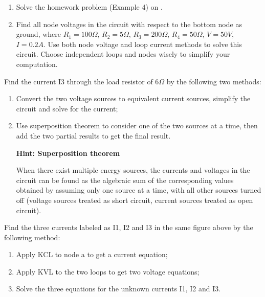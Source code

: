 \begin{enumerate}
\item Solve the homework problem (Example 4) on 
  .

\item Find all node voltages in the circuit with respect to the bottom node as
  ground, where $R_1=100\Omega$, $R_2=5\Omega$, $R_3=200\Omega$, $R_4=50\Omega$, 
  $V=50V$, $I=0.2A$.  Use both node voltage and loop current methods to solve 
  this circuit. Choose independent loops and nodes wisely to simplify your
  computation.  


\end{enumerate}


\item Find the current I3 through the load resistor of 6$\Omega$ by the
following two methods:
\begin{enumerate}
\item Convert the two voltage sources to equivalent current sources, 
	simplify the circuit and solve for the current;
\item Use superposition theorem to consider one of the two sources at a
  time, then add the two partial results to get the final result.

{\bf Hint: Superposition theorem}

When there exist multiple energy sources, the currents and voltages in 
the circuit can be found as the algebraic sum of the corresponding values 
obtained by assuming only one source at a time, with all other sources 
turned off (voltage sources treated as short circuit, current sources 
treated as open circuit).

\end{enumerate}



\item Find the three currents labeled as I1, I2 and I3 in the same figure 
	above by the following method:
\begin{enumerate}
\item Apply KCL to node a to get a current equation;
\item Apply KVL to the two loops to get two voltage equations;
\item Solve the three equations for the unknown currents I1, I2 and I3.
\end{enumerate}

